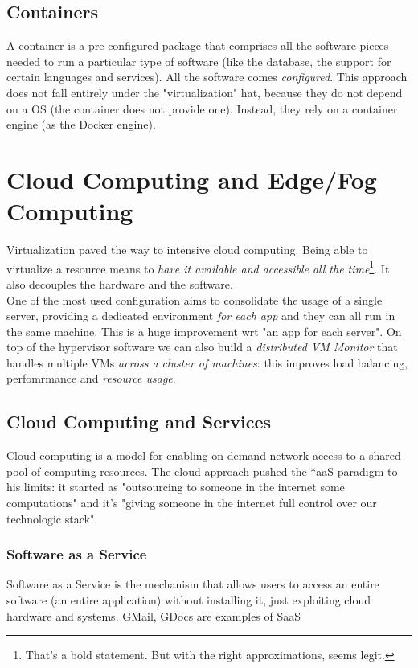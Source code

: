 \documentclass{article}
\begin{document}
			\subsection{Containers}
				A container is a pre configured package that comprises all the software pieces needed to run a particular type of software (like the database, the support for certain languages and services). All the software comes \emph{configured}. This approach does not fall entirely under the "virtualization" hat, because they do not depend on a OS (the container does not provide one). Instead, they rely on a container engine (as the Docker engine).
				
		\section{Cloud Computing and Edge/Fog Computing}
			Virtualization paved the way to intensive cloud computing. Being able to virtualize a resource means to \emph{have it available and accessible all the time}\footnote{That's a bold statement. But with the right approximations, seems legit.}. It also decouples the hardware and the software.\\
			One of the most used configuration aims to consolidate the usage of a single server, providing a dedicated environment \emph{for each app} and they can all run in the same machine. This is a huge improvement wrt "an app for each server". On top of the hypervisor software we can also build a \emph{distributed VM Monitor} that handles multiple VMs \emph{across a cluster of machines}: this improves load balancing, perfomrmance and \emph{resource usage}.\\
			
			\subsection{Cloud Computing and Services}
				Cloud computing is a model for enabling on demand network access to a shared pool of computing resources. The cloud approach pushed the *aaS paradigm to his limits: it started as "outsourcing to someone in the internet some computations" and it's "giving someone in the internet full control over our technologic stack".
				
				\subsubsection{Software as a Service}
					Software as a Service is the mechanism that allows users to access an entire software (an entire application) without installing it, just exploiting cloud hardware and systems. GMail, GDocs are examples of SaaS
				
\end{document}
